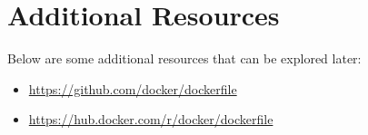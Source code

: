 \documentclass{article}
\begin{document}
\section{Additional Resources}
Below are some additional resources that can be explored later:

\begin{itemize}
    \item \href{https://github.com/docker/dockerfile}{https://github.com/docker/dockerfile}
    \item \href{https://hub.docker.com/r/docker/dockerfile}{https://hub.docker.com/r/docker/dockerfile}
\end{itemize}



\end{document}
